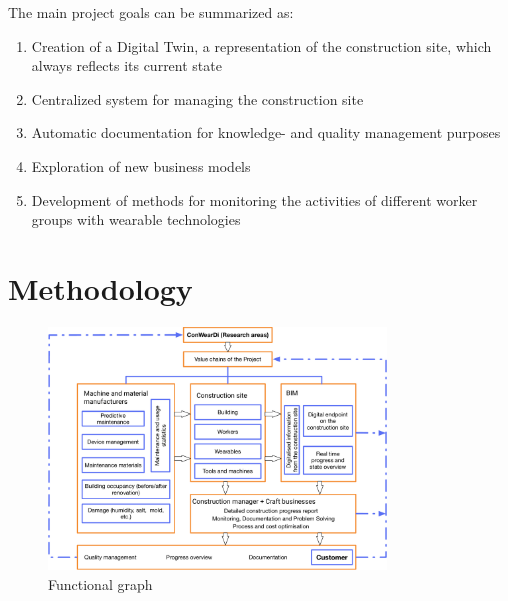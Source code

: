 
The main project goals can be summarized as:
\begin{enumerate}
  \item Creation of a Digital Twin, a representation of the construction site, which always reflects its current state 
  \item Centralized system for managing the construction site
  \item Automatic documentation for knowledge- and quality management purposes
  \item Exploration of new business models
  \item Development of methods for monitoring the activities of different worker groups with wearable technologies
\end{enumerate}

\section{Methodology}

\begin{figure}
\includegraphics[width=0.8\textwidth]{figures/conweardi-functional}
\caption{Functional graph}
\end{figure}



